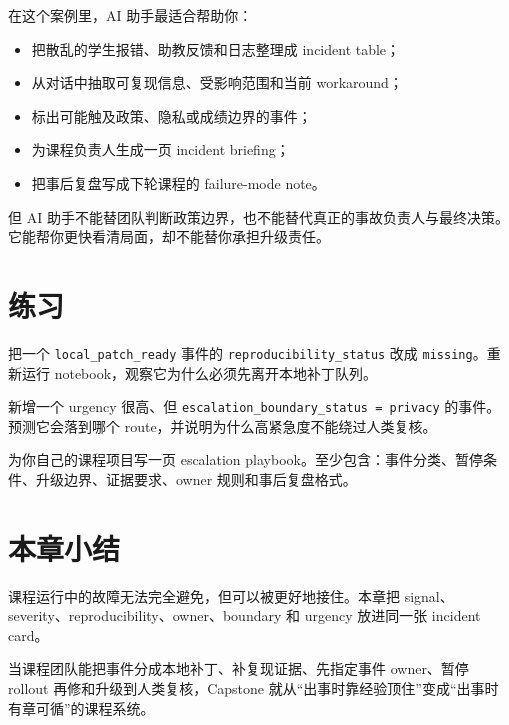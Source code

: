 在这个案例里，AI 助手最适合帮助你：

\begin{itemize}
    \item 把散乱的学生报错、助教反馈和日志整理成 incident table；
    \item 从对话中抽取可复现信息、受影响范围和当前 workaround；
    \item 标出可能触及政策、隐私或成绩边界的事件；
    \item 为课程负责人生成一页 incident briefing；
    \item 把事后复盘写成下轮课程的 failure-mode note。
\end{itemize}

但 AI 助手不能替团队判断政策边界，也不能替代真正的事故负责人与最终决策。它能帮你更快看清局面，却不能替你承担升级责任。

\section{练习}

\begin{exercisebox}[基础练习]
把一个 \texttt{local\_patch\_ready} 事件的 \texttt{reproducibility\_status} 改成 \texttt{missing}。重新运行 notebook，观察它为什么必须先离开本地补丁队列。
\end{exercisebox}

\begin{exercisebox}[进阶练习]
新增一个 urgency 很高、但 \texttt{escalation\_boundary\_status = privacy} 的事件。预测它会落到哪个 route，并说明为什么高紧急度不能绕过人类复核。
\end{exercisebox}

\begin{exercisebox}[开放练习]
为你自己的课程项目写一页 escalation playbook。至少包含：事件分类、暂停条件、升级边界、证据要求、owner 规则和事后复盘格式。
\end{exercisebox}

\section{本章小结}

课程运行中的故障无法完全避免，但可以被更好地接住。本章把 signal、severity、reproducibility、owner、boundary 和 urgency 放进同一张 incident card。

当课程团队能把事件分成本地补丁、补复现证据、先指定事件 owner、暂停 rollout 再修和升级到人类复核，Capstone 就从“出事时靠经验顶住”变成“出事时有章可循”的课程系统。
